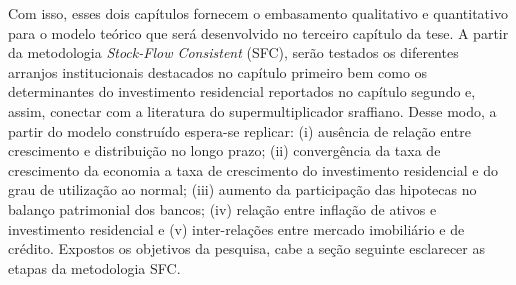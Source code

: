 Com isso, esses dois capítulos fornecem o embasamento qualitativo e quantitativo para o modelo teórico que será desenvolvido no terceiro capítulo da tese. A partir da metodologia \textit{Stock-Flow Consistent} (SFC), serão testados os diferentes arranjos institucionais destacados no capítulo primeiro bem como os determinantes do investimento residencial reportados no capítulo segundo e, assim, conectar com a literatura do supermultiplicador sraffiano. Desse modo, a partir do modelo construído espera-se replicar: (i) ausência de relação entre crescimento e distribuição no longo prazo; (ii) convergência da taxa de crescimento da economia a taxa de crescimento do investimento residencial e do grau de utilização ao normal; (iii) aumento da participação das hipotecas no balanço patrimonial dos bancos; (iv) relação entre inflação de ativos e investimento residencial e (v) inter-relações entre mercado imobiliário e de crédito. Expostos os objetivos da pesquisa, cabe a seção seguinte esclarecer as etapas da metodologia SFC.



